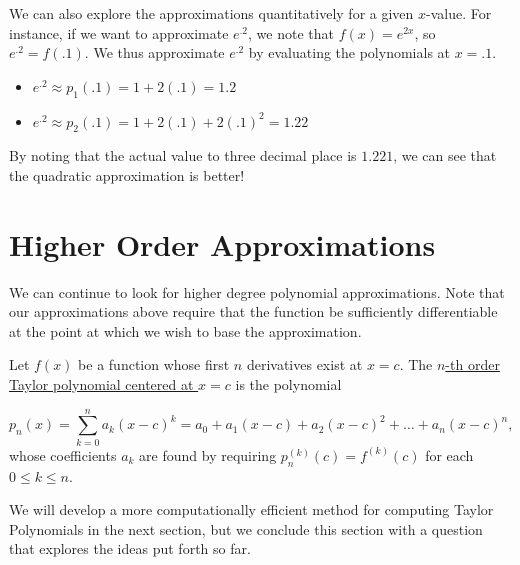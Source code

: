 \documentclass{ximera}
\begin{document}
We can also explore the approximations quantitatively for a given $x$-value.  For instance, if we want to approximate $e^{.2}$, we note that $f(x)=e^{2x}$, so $e^{.2}=f(.1)$.  We thus approximate $e^{.2}$ by evaluating the polynomials at $x=.1$.

\begin{itemize}
\item $e^{.2} \approx p_1(.1) = 1+2(.1) = 1.2$
\item $e^{.2} \approx p_2(.1) = 1+2(.1)+2(.1)^2 = 1.22$
\end{itemize}

By noting that the actual value to three decimal place is $1.221$, we can see that the quadratic approximation is better! 

\section{Higher Order Approximations}

We can continue to look for higher degree polynomial approximations.  Note that our approximations above require that the function be sufficiently differentiable at the point at which we wish to base the approximation.

\begin{definition}
Let $f(x)$ be a function whose first $n$ derivatives exist at $x=c$.  The \underline{$n$-th order Taylor polynomial centered at $x=c$} is the polynomial

\[
p_n(x) = \sum_{k=0}^n a_k(x-c)^k = a_0+a_1(x-c)+a_2(x-c)^2+\ldots+ a_n(x-c)^n,
\]
whose coefficients $a_k$ are found by requiring $p_n^{(k)}(c) = f^{(k)}(c)$ for each $0 \leq k \leq n$.
\end{definition}

We will develop a more computationally efficient method for computing Taylor Polynomials in the next section, but we conclude this section with a question that explores the ideas put forth so far.
\end{document}
